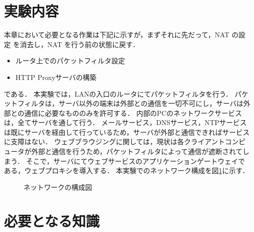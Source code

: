 \section{実験内容}
本章において必要となる作業は下記に示すが，まずそれに先だって，NAT の設定
を消去し，NAT を行う前の状態に戻す．
\begin{itemize}
  \item ルータ上でのパケットフィルタ設定
  \item HTTP Proxyサーバの構築
\end{itemize}
である．
本実験では，LANの入口のルータにてパケットフィルタを行う．
パケットフィルタは，サーバ以外の端末は外部との通信を一切不可にし，サーバは外部との通信に必要なもののみを許可する．
内部のPCのネットワークサービスは，全てサーバを通して行う．
メールサービス，DNSサービス，NTPサービスは既にサーバを経由して行っているため，サーバが外部と通信できればサービスに支障はない．
ウェブブラウジングに関しては，現状は各クライアントコンピュータが外部と通信を行うため，パケットフィルタによって通信が遮断されてしまう．
そこで，サーバにてウェブサービスのアプリケーションゲートウェイである，ウェブプロキシを導入する．
本実験でのネットワーク構成を図\ref{fig:26:packet-filter}に示す．

\begin{figure}
  \centering
  \caption{ネットワークの構成図}
  \label{fig:26:packet-filter}
\end{figure}

\section{必要となる知識}
